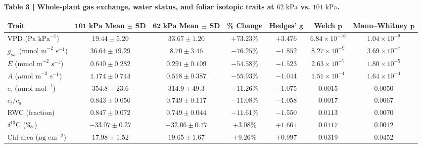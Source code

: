 \documentclass[10pt,a4paper]{article}
\begin{document}
\begin{center}
\small
\textbf{\textsf{Table 3 \;|\; Whole-plant gas exchange, water status, and foliar isotopic traits at $62\text{ kPa}$ vs. $101\text{ kPa}$.}}\\[6pt]
\begin{tabular}{lcccccc}
\toprule
\textbf{Trait} & $\mathbf{101\text{ kPa}}$ Mean $\pm$ SD & $\mathbf{62\text{ kPa}}$ Mean $\pm$ SD & \textbf{\% Change} & \textbf{Hedges'} $\boldsymbol{g}$ & \textbf{Welch} $\boldsymbol{p}$ & \textbf{Mann--Whitney} $\boldsymbol{p}$ \\
\midrule
VPD ($\text{Pa kPa}^{-1}$) & $19.44 \pm 5.20$ & $33.67 \pm 1.20$ & $+73.23\%$ & $+3.476$ & $6.84 \times 10^{-16}$ & $1.04 \times 10^{-9}$ \\
$g_{sw}$ ($\text{mmol m}^{-2}\text{ s}^{-1}$) & $36.64 \pm 19.29$ & $8.70 \pm 3.46$ & $-76.25\%$ & $-1.852$ & $8.27 \times 10^{-9}$ & $3.69 \times 10^{-7}$ \\
$E$ ($\text{mmol m}^{-2}\text{ s}^{-1}$) & $0.640 \pm 0.282$ & $0.291 \pm 0.109$ & $-54.58\%$ & $-1.523$ & $2.63 \times 10^{-7}$ & $1.80 \times 10^{-5}$ \\
$A$ ($\mu\text{mol m}^{-2}\text{ s}^{-1}$) & $1.174 \pm 0.744$ & $0.518 \pm 0.387$ & $-55.93\%$ & $-1.044$ & $1.51 \times 10^{-4}$ & $1.64 \times 10^{-4}$ \\
$c_i$ ($\mu\text{mol mol}^{-1}$) & $354.8 \pm 23.6$ & $314.9 \pm 49.3$ & $-11.26\%$ & $-1.075$ & $0.0015$ & $0.0050$ \\
$c_i/c_a$ & $0.843 \pm 0.056$ & $0.749 \pm 0.117$ & $-11.08\%$ & $-1.058$ & $0.0017$ & $0.0067$ \\
RWC (fraction) & $0.847 \pm 0.072$ & $0.749 \pm 0.044$ & $-11.61\%$ & $-1.550$ & $0.0113$ & $0.0070$ \\
$\delta^{13}\text{C}$ ($\text{\textperthousand}$) & $-33.07 \pm 0.27$ & $-32.06 \pm 0.77$ & $+3.08\%$ & $+1.661$ & $0.0117$ & $0.0012$ \\
Chl area ($\mu\text{g cm}^{-2}$) & $17.98 \pm 1.52$ & $19.65 \pm 1.67$ & $+9.26\%$ & $+0.997$ & $0.0319$ & $0.0452$ \\
\bottomrule
\end{tabular}
\end{center}
\vspace{0.8cm}
\end{document}
